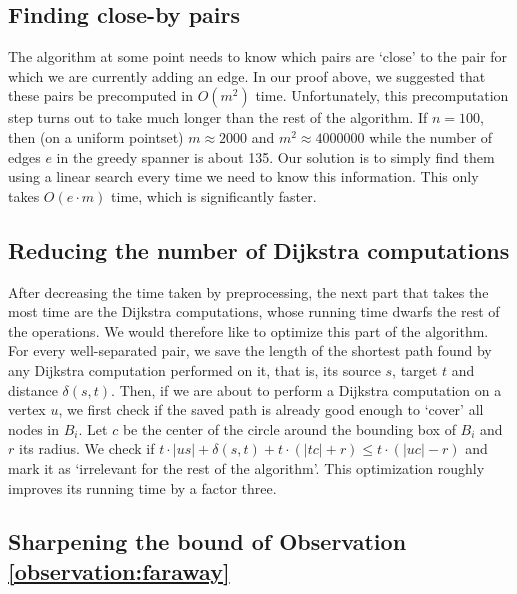 \documentclass[runningheads,envcountsame,oribibl,orivec]{llncs}
\begin{document}
\subsection{Finding close-by pairs}
The algorithm at some point needs to know which pairs are `close' to the pair for which we are currently adding an edge. In our proof above, we suggested that these pairs be precomputed in $O(m^2)$ time. Unfortunately, this precomputation step turns out to take much longer than the rest of the algorithm. If $n=100$, then (on a uniform pointset) $m \approx 2000$ and $m^2 \approx 4000000$ while the number of edges $e$ in the greedy spanner is about 135. Our solution is to simply find them using a linear search every time we need to know this information. This only takes $O(e \cdot m)$ time, which is significantly faster.

\subsection{Reducing the number of Dijkstra computations}

After decreasing the time taken by preprocessing, the next part that takes the most time are the Dijkstra computations, whose running time dwarfs the rest of the operations. We would therefore like to optimize this part of the algorithm. For every well-separated pair, we save the length of the shortest path found by any Dijkstra computation performed on it, that is, its source $s$, target $t$ and distance $\delta(s, t)$. Then, if we are about to perform a Dijkstra computation on a vertex $u$, we first check if the saved path is already good enough to `cover' all nodes in $B_i$. Let $c$ be the center of the circle around the bounding box of $B_i$ and $r$ its radius. We check if $t \cdot |us| + \delta(s, t) + t \cdot (|tc| + r) \leq t \cdot (|uc| - r)$ and mark it as `irrelevant for the rest of the algorithm'. This optimization roughly improves its running time by a factor three.

\subsection{Sharpening the bound of Observation \ref{observation:faraway}}
\end{document}
